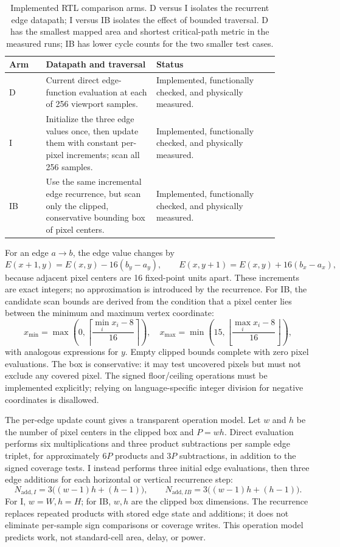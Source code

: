 \documentclass[10pt,a4paper]{article}
\begin{document}
\begin{table}[!htbp]
\centering
\small
\begin{tabular}{p{0.12\linewidth}p{0.36\linewidth}p{0.40\linewidth}}
\toprule
Arm & Datapath and traversal & Status\\
\midrule
D & Current direct edge-function evaluation at each of 256 viewport
samples. & Implemented, functionally checked, and physically measured.\\
I & Initialize the three edge values once, then update them with constant
per-pixel increments; scan all 256 samples. & Implemented, functionally
checked, and physically measured.\\
IB & Use the same incremental edge recurrence, but scan only the clipped,
conservative bounding box of pixel centers. & Implemented, functionally
checked, and physically measured.\\
\bottomrule
\end{tabular}
\caption{Implemented RTL comparison arms. D versus I isolates the recurrent
edge datapath; I versus IB isolates the effect of bounded traversal. D has
the smallest mapped area and shortest critical-path metric in the measured
runs; IB has lower cycle counts for the two smaller test cases.}
\label{tab:arms}
\end{table}

For an edge \(a\rightarrow b\), the edge value changes by
\[
E(x+1,y)=E(x,y)-16(b_y-a_y),\qquad
E(x,y+1)=E(x,y)+16(b_x-a_x),
\]
because adjacent pixel centers are 16 fixed-point units apart. These
increments are exact integers; no approximation is introduced by the
recurrence. For IB, the candidate scan bounds are derived from the condition
that a pixel center lies between the minimum and maximum vertex coordinate:
\[
x_{\min}=\max\!\left(0,\left\lceil
\frac{\min_i x_i-8}{16}\right\rceil\right),\quad
x_{\max}=\min\!\left(15,\left\lfloor
\frac{\max_i x_i-8}{16}\right\rfloor\right),
\]
with analogous expressions for \(y\). Empty clipped bounds complete with
zero pixel evaluations. The box is conservative: it may test uncovered
pixels but must not exclude any covered pixel. The signed floor/ceiling
operations must be implemented explicitly; relying on language-specific
integer division for negative coordinates is disallowed.

The per-edge update count gives a transparent operation model. Let \(w\)
and \(h\) be the number of pixel centers in the clipped box and \(P=wh\).
Direct evaluation performs six multiplications and three product subtractions
per sample edge triplet, for approximately \(6P\) products and \(3P\)
subtractions, in addition to the signed coverage tests. I instead performs
three initial edge evaluations, then three edge additions for each
horizontal or vertical recurrence step:
\[
N_{\mathrm{add},I}=3\big((w-1)h+(h-1)\big),\qquad
N_{\mathrm{add},IB}=3\big((w-1)h+(h-1)\big).
\]
For I, \(w=W,h=H\); for IB, \(w,h\) are the clipped box dimensions. The
recurrence replaces repeated products with stored edge state and additions;
it does not eliminate per-sample sign comparisons or coverage writes. This
operation model predicts work, not standard-cell area, delay, or power.
\end{document}
